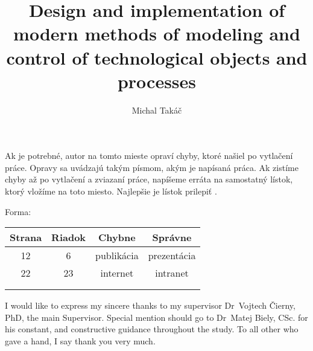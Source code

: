 \documentclass[]{tukethesis}
\author{Michal Takáč}
\title{Design and implementation of modern methods of modeling and control of technological objects and processes}
\subtitle{}
\begin{document}
\renewcommand\theHfigure{\theHsection.\arabic{figure}}
\renewcommand\theHtable{\theHsection.\arabic{table}}

\firstpage

\titlepage


\errata %
Ak je potrebné, autor na tomto mieste opraví chyby, ktoré našiel
po vytlačení práce. Opravy sa uvádzajú takým písmom, akým je napísaná
práca. Ak zistíme chyby až po vytlačení a zviazaní práce, napíšeme
erráta na samostatný lístok, ktorý vložíme na toto miesto. Najlepšie je
lístok prilepiť\/ \citep{kat}.

Forma:

\tabcolsep=10pt
\begin{table}[!hb]
	\centering
	\begin{tabular}{|c|c|c|c|}\hline
Strana & Riadok & Chybne & Správne \\\hline\hline
12 & 6 & publikácia & prezentácia \\\hline
22 & 23 & internet & intranet \\\hline
& & & \\\hline
& & & \\\hline
	\end{tabular}
\end{table}
\kerrata

\abstrakte %

\abstrakt %

\endabstract %

\assignthesis

\declaration

\acknowledgement %
I would like to express my sincere thanks to my supervisor Dr~Vojtech
Čierny, PhD, the main Supervisor. Special mention should go
to Dr~Matej Biely, CSc. for his constant, and constructive guidance
throughout the study. To all other who gave a hand, I say thank you
very much.
\endacknowledgement
\end{document}
